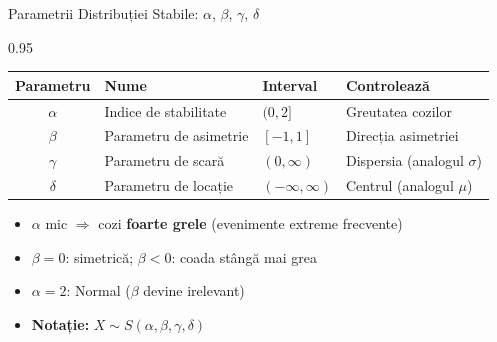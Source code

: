 \documentclass[9pt, aspectratio=169, t]{beamer}
\begin{document}
\begin{frame}{Parametrii Distribuției Stabile: $\alpha$, $\beta$, $\gamma$, $\delta$}
\begin{cminipage}{0.95\textwidth}
    \renewcommand{\arraystretch}{1.3}
    \begin{center}
    \begin{tabular}{clll}
    \toprule
    \textbf{Parametru} & \textbf{Nume} & \textbf{Interval} & \textbf{Controlează} \\
    \midrule
    $\alpha$ & Indice de stabilitate & $(0, 2]$ & Greutatea cozilor \\
    $\beta$ & Parametru de asimetrie & $[-1, 1]$ & Direcția asimetriei \\
    $\gamma$ & Parametru de scară & $(0, \infty)$ & Dispersia (analogul $\sigma$) \\
    $\delta$ & Parametru de locație & $(-\infty, \infty)$ & Centrul (analogul $\mu$) \\
    \bottomrule
    \end{tabular}
    \end{center}

    \vspace{0.2cm}
    \begin{itemize}\setlength{\itemsep}{0pt}
        \item $\alpha$ mic $\Rightarrow$ cozi \textbf{foarte grele} (evenimente extreme frecvente)
        \item $\beta = 0$: simetrică; $\beta < 0$: coada stângă mai grea
        \item $\alpha = 2$: Normal ($\beta$ devine irelevant)
        \item \textbf{Notație:} $X \sim S(\alpha, \beta, \gamma, \delta)$
    \end{itemize}
\end{cminipage}
\end{frame}
\end{document}

